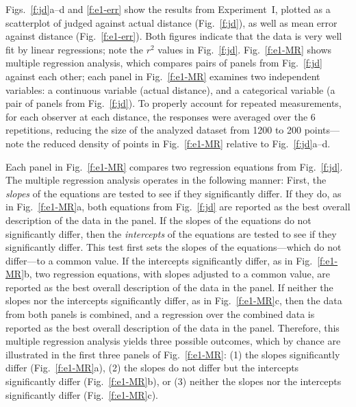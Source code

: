 \documentclass[10pt,journal,compsoc]{IEEEtran}
\begin{document}
Figs.~\ref{f:jd}a--d and \ref{f:e1-err} show the results from Experiment~I, plotted as a scatterplot of judged against actual distance (Fig.~\ref{f:jd}), as well as mean error against distance (Fig.~\ref{f:e1-err}).  Both figures indicate that the data is very well fit by linear regressions; note the $r^{2}$ values in Fig.~\ref{f:jd}.  Fig.~\ref{f:e1-MR} shows multiple regression analysis, which compares pairs of panels from Fig.~\ref{f:jd} against each other; each panel in Fig.~\ref{f:e1-MR} examines two independent variables: a continuous variable (actual distance), and a categorical variable (a pair of panels from Fig.~\ref{f:jd}).  To properly account for repeated measurements, for each observer at each distance, the responses were averaged over the 6 repetitions, reducing the size of the analyzed dataset from 1200 to 200 points---note the reduced density of points in Fig.~\ref{f:e1-MR} relative to Fig.~\ref{f:jd}a--d.

Each panel in Fig.~\ref{f:e1-MR} compares two regression equations from Fig.~\ref{f:jd}.
The multiple regression analysis operates in the following manner: 
First, the \emph{slopes} of the equations are tested to see if they significantly differ.  If they do, as in Fig.~\ref{f:e1-MR}a, both equations from Fig.~\ref{f:jd} are reported as the best overall description of the data in the panel.
If the slopes of the equations do not significantly differ, then the \emph{intercepts} of the equations are tested to see if they significantly differ.  This test first sets the slopes of the equations---which do not differ---to a common value.  If the intercepts significantly differ, as in Fig.~\ref{f:e1-MR}b, two regression equations, with slopes adjusted to a common value, are reported as the best overall description of the data in the panel.
If neither the slopes nor the intercepts significantly differ, as in Fig.~\ref{f:e1-MR}c, then the data from both panels is combined, and a regression over the combined data is reported as the best overall description of the data in the panel.  
Therefore, this multiple regression analysis yields three possible outcomes, which by chance are illustrated in the first three panels of Fig.~\ref{f:e1-MR}: (1) the slopes significantly differ (Fig.~\ref{f:e1-MR}a), (2) the slopes do not differ but the intercepts significantly differ (Fig.~\ref{f:e1-MR}b), or (3) neither the slopes nor the intercepts significantly differ (Fig.~\ref{f:e1-MR}c).  
\end{document}

